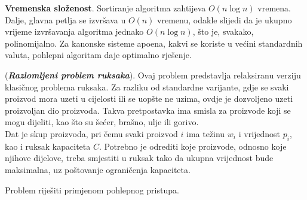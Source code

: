 \textbf{Vremenska složenost}. Sortiranje algoritma zahtijeva $O(n \log n)$ vreme\-na. Dalje, glavna petlja se izvršava u $O(n)$ vremenu, odakle slijedi da je ukupno vrijeme izvršavanja algoritma jednako $O(n \log n)$, što je, svakako, polinomi\-jalno. Za kanonske sisteme apoena, kakvi se koriste u većini standardnih valuta, pohlepni algoritam daje optimalno rješenje.   %


\begin{example}
	(\textbf{\emph{Razlomljeni problem ruksaka}}). Ovaj problem predstavlja relaksiranu verziju klasičnog problema ruksaka. Za razliku od standardne varijante, gdje se svaki proizvod mora uzeti u cijelosti ili se uopšte ne uzima, ovdje je dozvoljeno uzeti proizvoljan dio proizvoda. Takva pretpostavka ima smisla za proizvode koji se mogu dijeliti, kao što su šećer, brašno, ulje ili gorivo. \\
	
	Dat je skup proizvoda, pri čemu svaki proizvod $i$ ima težinu $w_i$ i vrijednost $p_i$, kao i ruksak kapaciteta $C$. Potrebno je odrediti koje proizvode, odnosno koje njihove dijelove, treba smjestiti u ruksak tako da ukupna vrijednost bude maksimalna, uz poštovanje ograničenja kapaciteta.
	
	Problem riješiti primjenom pohlepnog pristupa.
\end{example}

